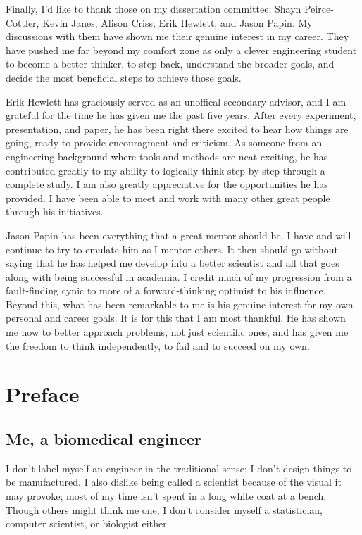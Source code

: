 Finally, I'd like to thank those on my dissertation committee:
Shayn Peirce-Cottler, Kevin Janes, Alison Criss, Erik Hewlett, and Jason Papin.
My discussions with them have shown me their genuine interest in my career.
They have pushed me far beyond my comfort zone as only
a clever engineering student to become a better thinker, to step
back, understand the broader goals, and decide the most beneficial
steps to achieve those goals.

Erik Hewlett has graciously served as an unoffical secondary advisor,
and I am grateful for the time he has given me the past five years.
After every experiment, presentation, and paper, he has been right there
excited to hear how things are going, ready to provide encouragment and criticism.
As someone from an engineering background where tools and 
methods are neat exciting,
he has contributed greatly to my ability to logically think step-by-step
through a complete study. I am also greatly appreciative for the opportunities he has provided.
I have been able to meet and work with many other great people through his initiatives.

Jason Papin has been everything that a great mentor should be.
I have and will continue to try to emulate him as I mentor others.
It then should go without saying that he has helped me develop
into a better scientist and all that goes along with being successful in academia.
I credit much of my progression from a fault-finding cynic to more of a  
forward-thinking optimist to his influence.
Beyond this, what has been remarkable to me is his genuine interest for 
my own personal and career goals. It is for this that I am most thankful.
He has shown me how to better approach problems, not just scientific ones, and has
given me the freedom to think independently, to fail and to succeed on my own.


\chapter{Preface}

\section{Me, a biomedical engineer}

I don't label myself an engineer in the traditional sense; 
I don't design things to be manufactured. I also dislike 
being called a scientist because of the visual it may provoke; 
most of my time isn't spent in a long white coat at a 
bench. Though others might think me one, I don't consider 
myself a statistician, computer scientist, or biologist either.

